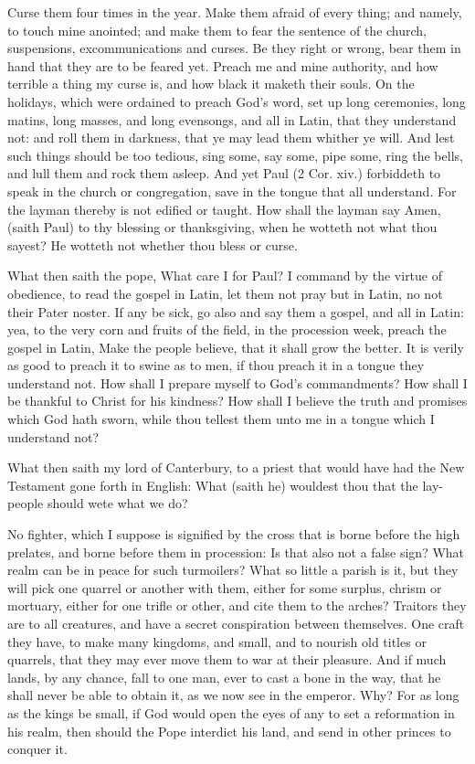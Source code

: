Curse them four times in the year. Make them afraid 
of every thing; and namely, to touch mine anointed; and 
make them to fear the sentence of the church, suspensions, 
excommunications and curses. Be they right or wrong, 
bear them in hand that they are to be feared yet. Preach 
me and mine authority, and how terrible a thing my curse 
is, and how black it maketh their souls. On the holidays, 
which were ordained to preach God's word, set up long 
ceremonies, long matins, long masses, and long evensongs,
and all in Latin, that they understand not: and 
roll them in darkness, that ye may lead them whither 
ye will. And lest such things should be too tedious, sing 
some, say some, pipe some, ring the bells, and lull them 
and rock them asleep. And yet Paul (2 Cor. xiv.) forbiddeth
to speak in the church or congregation, save in 
the tongue that all understand. For the layman thereby 
is not edified or taught. How shall the layman say Amen, 
(saith Paul) to thy blessing or thanksgiving, when he 
wotteth not what thou sayest? He wotteth not whether 
thou bless or curse. 

What then saith the pope, What care I for Paul? I 
command by the virtue of obedience, to read the gospel 
in Latin, let them not pray but in Latin, no not their 
Pater noster. If any be sick, go also and say them 
a gospel, and all in Latin: yea, to the very corn and 
fruits of the field, in the procession week, preach the 
gospel in Latin, Make the people believe, that it shall 
grow the better. It is verily as good to preach it to swine 
as to men, if thou preach it in a tongue they understand 
not. How shall I prepare myself to God's commandments?
How shall I be thankful to Christ for his kindness?
How shall I believe the truth and promises which 
God hath sworn, while thou tellest them unto me in a 
tongue which I understand not? 

What then saith my lord of Canterbury, to a priest 
that would have had the New Testament gone forth in 
English: What (saith he) wouldest thou that the lay- 
people should wete what we do? 

No fighter, which I suppose is signified by the cross 
that is borne before the high prelates, and borne before 
them in procession: Is that also not a false sign? What 
realm can be in peace for such turmoilers? What so 
little a parish is it, but they will pick one quarrel or 
another with them, either for some surplus, chrism or 
mortuary, either for one trifle or other, and cite them to 
the arches? Traitors they are to all creatures, and have 
a secret conspiration between themselves. One craft they 
have, to make many kingdoms, and small, and to nourish 
old titles or quarrels, that they may ever move them to 
war at their pleasure. And if much lands, by any chance, 
fall to one man, ever to cast a bone in the way, that he 
shall never be able to obtain it, as we now see in the 
emperor. Why? For as long as the kings be small, if 
God would open the eyes of any to set a reformation in 
his realm, then should the Pope interdict his land, and 
send in other princes to conquer it. 

